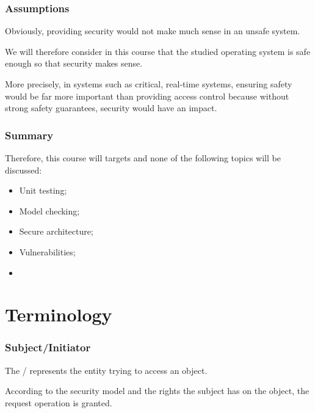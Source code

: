 
\begin{frame}
  \frametitle{Assumptions}

  Obviously, providing security would not make much sense in an unsafe
  system.

  \-

  We will therefore consider in this course that the studied operating system
  is safe enough so that security makes sense.

  \-

  More precisely, in systems such as critical, real-time \etc{} systems,
  ensuring safety would be far more important than providing access control
  because without strong safety guarantees, security would have an impact.
\end{frame}


\begin{frame}
  \frametitle{Summary}

  Therefore, this course will targets  and none of
  the following topics will be discussed:

  \-

  \begin{itemize}
    \item
      Unit testing;
    \item
      Model checking;
    \item
      Secure architecture;
    \item
      Vulnerabilities;
    \item
      \etc{}
  \end{itemize}
\end{frame}

%
%

\section{Terminology}


\begin{frame}
  \frametitle{Subject/Initiator}

  The / represents the entity trying to access
  an object.

  \-

  According to the security model and the rights the subject has on the
  object, the request operation is granted.
\end{frame}

